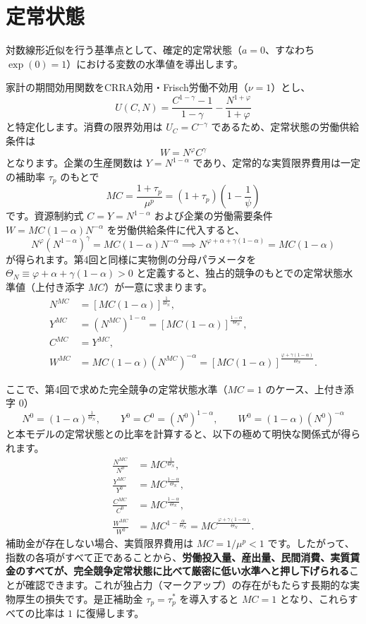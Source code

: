 \documentclass[
  japanese,
  lualatex,
  ja=standard,
  12pt,
  a4paper]{ltjsarticle}
\begin{document}
\section{定常状態}\label{ux5b9aux5e38ux72b6ux614b}

対数線形近似を行う基準点として、確定的定常状態（\(a=0\)、すなわち
\(\exp(0)=1\)）における変数の水準値を導出します。

家計の期間効用関数をCRRA効用・Frisch労働不効用（\(\nu=1\)）とし、 \[
U(C, N) = \frac{C^{1-\gamma}-1}{1-\gamma} - \frac{N^{1+\varphi}}{1+\varphi}
\] と特定化します。消費の限界効用は \(U_C = C^{-\gamma}\)
であるため、定常状態の労働供給条件は \[
W = N^\varphi C^\gamma
\] となります。企業の生産関数は \(Y = N^{1-\alpha}\)
であり、定常的な実質限界費用は一定の補助率 \(\tau_p\) のもとで \[
MC = \frac{1+\tau_p}{\mu^p} = (1+\tau_p) \left( 1 - \frac{1}{\psi} \right)
\] です。資源制約式 \(C = Y = N^{1-\alpha}\) および企業の労働需要条件
\(W = MC (1-\alpha) N^{-\alpha}\) を労働供給条件に代入すると、 \[
N^\varphi \left( N^{1-\alpha} \right)^\gamma = MC (1-\alpha) N^{-\alpha} \implies N^{\varphi + \alpha + \gamma(1-\alpha)} = MC (1-\alpha)
\] が得られます。第4回と同様に実物側の分母パラメータを
\(\Theta_N \equiv \varphi + \alpha + \gamma(1-\alpha) > 0\)
と定義すると、独占的競争のもとでの定常状態水準値（上付き添字
\(MC\)）が一意に求まります。 \[
\begin{aligned}
N^{MC} &= \left[ MC (1-\alpha) \right]^{\frac{1}{\Theta_N}},\\
Y^{MC} &= (N^{MC})^{1-\alpha} = \left[ MC (1-\alpha) \right]^{\frac{1-\alpha}{\Theta_N}},\\
C^{MC} &= Y^{MC},\\
W^{MC} &= MC (1-\alpha) (N^{MC})^{-\alpha} = \left[ MC (1-\alpha) \right]^{\frac{\varphi + \gamma(1-\alpha)}{\Theta_N}}.
\end{aligned}
\]

ここで、第4回で求めた完全競争の定常状態水準（\(MC = 1\)
のケース、上付き添字 \(0\)） \[
N^0 = (1-\alpha)^{\frac{1}{\Theta_N}}, \qquad Y^0 = C^0 = (N^0)^{1-\alpha}, \qquad W^0 = (1-\alpha) (N^0)^{-\alpha}
\]
と本モデルの定常状態との比率を計算すると、以下の極めて明快な関係式が得られます。
\[
\begin{aligned}
\frac{N^{MC}}{N^0} &= MC^{\frac{1}{\Theta_N}},\\
\frac{Y^{MC}}{Y^0} &= MC^{\frac{1-\alpha}{\Theta_N}},\\
\frac{C^{MC}}{C^0} &= MC^{\frac{1-\alpha}{\Theta_N}},\\
\frac{W^{MC}}{W^0} &= MC^{1 - \frac{\alpha}{\Theta_N}} = MC^{\frac{\varphi + \gamma(1-\alpha)}{\Theta_N}}.
\end{aligned}
\] 補助金が存在しない場合、実質限界費用は \(MC = 1/\mu^p < 1\)
です。したがって、指数の各項がすべて正であることから、\textbf{労働投入量、産出量、民間消費、実質賃金のすべてが、完全競争定常状態に比べて厳密に低い水準へと押し下げられる}ことが確認できます。これが独占力（マークアップ）の存在がもたらす長期的な実物厚生の損失です。是正補助金
\(\tau_p = \tau_p^*\) を導入すると \(MC = 1\)
となり、これらすべての比率は \(1\) に復帰します。
\end{document}

